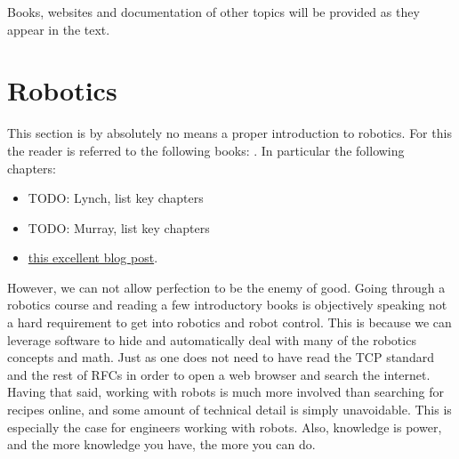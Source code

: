 Books, websites and documentation of other topics will be provided 
as they appear in the text.


\section{Robotics}
\label{sec-robotics-into}
This section is by absolutely no means a proper
introduction to robotics. 
For this the reader is referred to the following books:
\cite{murray,lynch}.
In particular the following chapters:
\begin{itemize}
		\item TODO: Lynch, list key chapters
		\item TODO: Murray, list key chapters
		\item \href{https://scaron.info/robotics/jacobian-of-a-kinematic-task-and-derivatives-on-manifolds.html}{this excellent blog post}.
\end{itemize}


However, we can not allow perfection to be the enemy of good.
Going through a robotics course and reading a few introductory 
books is objectively speaking not a hard requirement 
to get into robotics and robot control.
This is because we can leverage software to hide and 
automatically deal with many of the robotics concepts
and math. Just as one does not need to have read the
TCP standard and the rest of RFCs in order to open
a web browser and search the internet.
Having that said, working with robots is much more
involved than searching for recipes online,
and some amount of technical detail is simply unavoidable.
This is especially the case for engineers working with robots.
Also, knowledge is power, and the more knowledge you have,
the more you can do.

